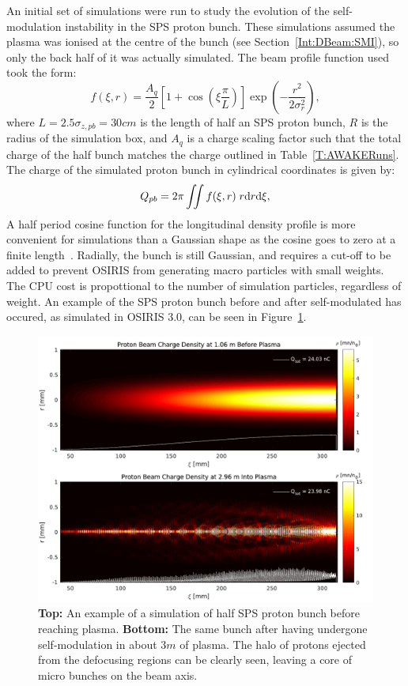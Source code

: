 An initial set of simulations were run to study the evolution of the self-modulation instability in the SPS proton bunch.
These simulations assumed the plasma was ionised at the centre of the bunch (see Section~\ref{Int:DBeam:SMI}), so only the back half of it was actually simulated.
The beam profile function used took the form:
\begin{equation}
    f(\xi,r) = \frac{A_{q}}{2} \left[1 + \cos\left(\xi\frac{\pi}{L}\right)\right] \exp\left(-\frac{r^{2}}{2\sigma_{r}^{2}}\right), \label{EQ:SPS-Profile}
\end{equation}
where $L = 2.5\sigma_{z,pb} = 30\unit{cm}$ is the length of half an SPS proton bunch, $R$ is the radius of the simulation box, and $A_{q}$ is a charge scaling factor such that the total charge of the half bunch matches the charge outlined in Table~\ref{T:AWAKERuns}.
The charge of the simulated proton bunch in cylindrical coordinates is given by:
\begin{equation}
    Q_{pb} = 2\pi \iint f(\xi,r) \;r \mathrm{d} r \mathrm{d} \xi, \label{EQ:SPS-Charge}
\end{equation}
A half period cosine function for the longitudinal density profile is more convenient for simulations than a Gaussian shape as the cosine goes to zero at a finite length~\cite{lotov:2010}.
Radially, the bunch is still Gaussian, and requires a cut-off to be added to prevent OSIRIS from generating macro particles with small weights.
The CPU cost is propottional to the number of simulation particles, regardless of weight.
An example of the SPS proton bunch before and after self-modulated has occured, as simulated in OSIRIS 3.0, can be seen in Figure~\ref{Fig:Sim:SMI}.

\begin{figure}[hbt]
    \centering
    \includegraphics[width=1.0\linewidth]{figures/PBSelfModulationBefAft}
    \caption{\label{Fig:Sim:SMI}
        \textbf{Top:} An example of a simulation of half SPS proton bunch before reaching plasma.
        \textbf{Bottom:} The same bunch after having undergone self-modulation in about $3\unit{m}$ of plasma.
        The halo of protons ejected from the defocusing regions can be clearly seen, leaving a core of micro bunches on the beam axis.
    }
\end{figure}

